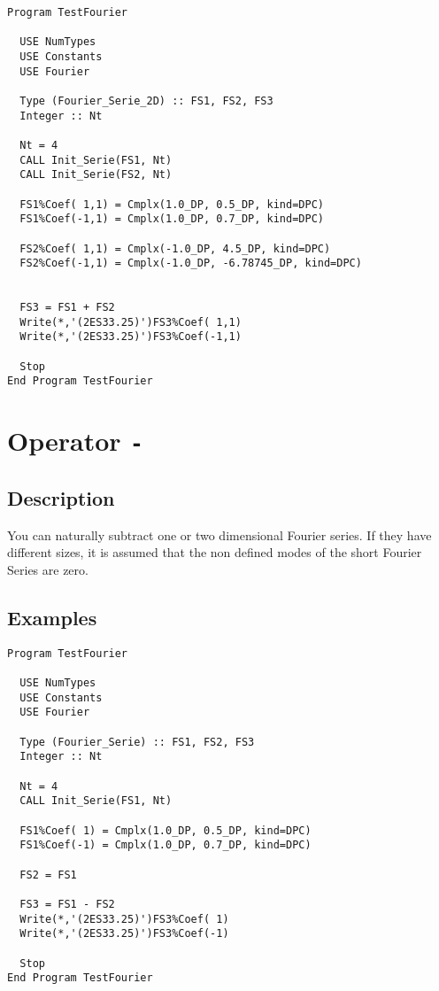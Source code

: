 \begin{lstlisting}[emph=Type,
                   emphstyle=\color{blue},
                   frame=trBL,
                   caption=Adding Fourier series.,
                   label=addf]
Program TestFourier

  USE NumTypes
  USE Constants
  USE Fourier

  Type (Fourier_Serie_2D) :: FS1, FS2, FS3
  Integer :: Nt

  Nt = 4
  CALL Init_Serie(FS1, Nt)
  CALL Init_Serie(FS2, Nt)

  FS1%Coef( 1,1) = Cmplx(1.0_DP, 0.5_DP, kind=DPC)
  FS1%Coef(-1,1) = Cmplx(1.0_DP, 0.7_DP, kind=DPC)
  
  FS2%Coef( 1,1) = Cmplx(-1.0_DP, 4.5_DP, kind=DPC)
  FS2%Coef(-1,1) = Cmplx(-1.0_DP, -6.78745_DP, kind=DPC)
  

  FS3 = FS1 + FS2
  Write(*,'(2ES33.25)')FS3%Coef( 1,1)
  Write(*,'(2ES33.25)')FS3%Coef(-1,1)

  Stop
End Program TestFourier
\end{lstlisting}

\section{Operator \texttt{-}}

\subsection{Description}

You can naturally subtract one or two dimensional Fourier series. If they
have different sizes, it is assumed that the non defined modes of the
short Fourier Series are zero.

\subsection{Examples}

\begin{lstlisting}[emph=Type,
                   emphstyle=\color{blue},
                   frame=trBL,
                   caption=Subtracting Fourier series.,
                   label=subf]
Program TestFourier

  USE NumTypes
  USE Constants
  USE Fourier

  Type (Fourier_Serie) :: FS1, FS2, FS3
  Integer :: Nt

  Nt = 4
  CALL Init_Serie(FS1, Nt)

  FS1%Coef( 1) = Cmplx(1.0_DP, 0.5_DP, kind=DPC)
  FS1%Coef(-1) = Cmplx(1.0_DP, 0.7_DP, kind=DPC)
  
  FS2 = FS1  

  FS3 = FS1 - FS2
  Write(*,'(2ES33.25)')FS3%Coef( 1)
  Write(*,'(2ES33.25)')FS3%Coef(-1)

  Stop
End Program TestFourier
\end{lstlisting}

